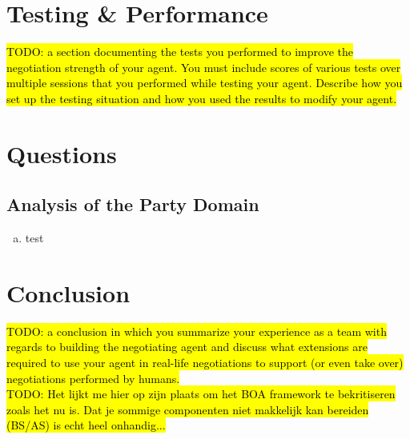 \documentclass[a4paper,10pt]{article}
\newcommand{\todo}[1] {\hl{TODO: #1}}
\begin{document}
\section{Testing \& Performance}
\label{sec:performance}
\todo{a section documenting the tests you performed to improve the negotiation strength of your agent. You must include scores of various tests over multiple sessions that you performed while testing your agent. Describe how you set up the testing situation and how you used the results to modify your agent.}

\section{Questions}
\label{sec:questions}

\subsection{Analysis of the Party Domain}

\begin{enumerate}[(a)]

\item{test}

\end{enumerate}

\section{Conclusion}
\label{sec:conclusion}
\todo{a conclusion in which you summarize your experience as a team with regards to building the negotiating agent and discuss what extensions are required to use your agent in real-life negotiations to support (or even take over) negotiations performed by humans.} \\ 

\todo{Het lijkt me hier op zijn plaats om het BOA framework te bekritiseren zoals het nu is. Dat je sommige componenten niet makkelijk kan bereiden (BS/AS) is echt heel onhandig...}




\end{document}
